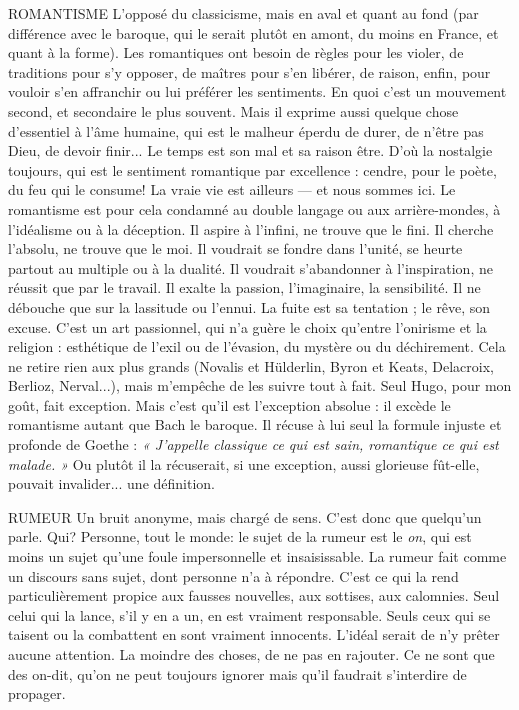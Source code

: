 ROMANTISME  L’opposé du classicisme, mais en aval et quant au fond (par
différence avec le baroque, qui le serait plutôt en amont,
du moins en France, et quant à la forme). Les romantiques ont besoin de règles
pour les violer, de traditions pour s’y opposer, de maîtres pour s’en libérer, de
raison, enfin, pour vouloir s’en affranchir ou lui préférer les sentiments. En
quoi c’est un mouvement second, et secondaire le plus souvent. Mais il exprime
aussi quelque chose d’essentiel à l’âme humaine, qui est le malheur éperdu de
durer, de n’être pas Dieu, de devoir finir... Le temps est son mal et sa raison
être. D’où la nostalgie toujours, qui est le sentiment romantique par
excellence : cendre, pour le poète, du feu qui le consume! La vraie vie est
ailleurs — et nous sommes ici. Le romantisme est pour cela condamné au
double langage ou aux arrière-mondes, à l’idéalisme ou à la déception. Il aspire
à l'infini, ne trouve que le fini. Il cherche l'absolu, ne trouve que le moi. Il voudrait
se fondre dans l’unité, se heurte partout au multiple ou à la dualité. Il
voudrait s’abandonner à l'inspiration, ne réussit que par le travail. Il exalte la
passion, l’imaginaire, la sensibilité. Il ne débouche que sur la lassitude ou
l'ennui. La fuite est sa tentation ; le rêve, son excuse. C’est un art passionnel,
qui n’a guère le choix qu’entre l’onirisme et la religion : esthétique de l'exil ou
de l'évasion, du mystère ou du déchirement. Cela ne retire rien aux plus grands
(Novalis et Hülderlin, Byron et Keats, Delacroix, Berlioz, Nerval...), mais
m’empêche de les suivre tout à fait. Seul Hugo, pour mon goût, fait exception.
Mais c’est qu’il est l’exception absolue : il excède le romantisme autant que
Bach le baroque. Il récuse à lui seul la formule injuste et profonde de Goethe :
{\it « J'appelle classique ce qui est sain, romantique ce qui est malade. »} Ou plutôt il la
récuserait, si une exception, aussi glorieuse fût-elle, pouvait invalider... une
définition.

RUMEUR Un bruit anonyme, mais chargé de sens. C’est donc que quelqu’un
parle. Qui? Personne, tout le monde: le sujet de la
rumeur est le {\it on}, qui est moins un sujet qu’une foule impersonnelle et insaisissable.
La rumeur fait comme un discours sans sujet, dont personne n’a à
répondre. C’est ce qui la rend particulièrement propice aux fausses nouvelles,
aux sottises, aux calomnies. Seul celui qui la lance, s’il y en a un, en est vraiment
responsable. Seuls ceux qui se taisent ou la combattent en sont vraiment
innocents. L'idéal serait de n’y prêter aucune attention. La moindre des choses,
de ne pas en rajouter. Ce ne sont que des on-dit, qu’on ne peut toujours
ignorer mais qu’il faudrait s’interdire de propager.
%

